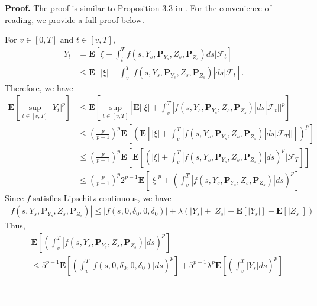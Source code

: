 \documentclass[10pt]{article}%
\numberwithin{equation}{section}
\newenvironment{proof}[1][Proof]{\noindent \textbf{#1.} }{\  \rule{0.5em}{0.5em}}
\begin{document}
\begin{proof}
    The proof is similar to Proposition 3.3 in \cite{LX}. For the convenience of reading, we provide a full proof below.

    For $v \in [0,T]$ and $t\in [v,T]$,
    \begin{equation}\begin{split}
       Y_t&=\mathbf{E}\left[\xi+\int_{t}^{T}f(s,Y_s, \mathbf{P}_{Y_s},Z_s,\mathbf{P}_{Z_s})ds|\mathcal{F}_t\right]\\
       &\leq \mathbf{E}\left[\left|\xi\right|+\int_{v}^{T}\left|f(s,Y_s, \mathbf{P}_{Y_s},Z_s,\mathbf{P}_{Z_s})\right|ds|\mathcal{F}_t\right].  
    \end{split}  
    \end{equation}
Therefore, we have 
\begin{equation}
    \begin{split}
\mathbf{E}\left[\sup_{t\in[v,T]}\left|Y_t\right|^p\right]&\leq \mathbf{E}\left[\sup_{t\in[v,T]}|\mathbf{E}[\left|\xi\right|+\int_{v}^{T}\left|f(s,Y_s, \mathbf{P}_{Y_s},Z_s,\mathbf{P}_{Z_s})\right|ds|\mathcal{F}_t]|^p\right]\\
&\leq \left(\frac{p}{p-1}\right)^p \mathbf{E}\left[\left(\mathbf{E}[\left|\xi\right|+\int_{v}^{T}\left|f(s,Y_s, \mathbf{P}_{Y_s},Z_s,\mathbf{P}_{Z_s})\right|ds|\mathcal{F}_T]|]\right)^p\right]\\
&\leq \left(\frac{p}{p-1}\right)^p \mathbf{E}\left[\mathbf{E}\left[\left(\left|\xi\right|+\int_{v}^{T}\left|f(s,Y_s, \mathbf{P}_{Y_s},Z_s,\mathbf{P}_{Z_s})\right|ds\right)^p|\mathcal{F}_T\right]\right]\\ 
&\leq \left(\frac{p}{p-1}\right)^p 2^{p-1} \mathbf{E}\left[|\xi|^p+\left(\int_{v}^{T}\left|f(s,Y_s, \mathbf{P}_{Y_s},Z_s,\mathbf{P}_{Z_s})\right|ds\right)^p\right]
\end{split}
\end{equation}
Since $f$ satisfies Lipschitz continuous, we have 
\begin{align}
    \left|f(s,Y_s, \mathbf{P}_{Y_s},Z_s,\mathbf{P}_{Z_s})\right|\leq \left|f(s,0, \delta_0,0,\delta_0)\right|+\lambda \left(\left|Y_s\right|+\left|Z_s\right|+\mathbf{E}[|Y_s|]+\mathbf{E}[|Z_s|]\right) 
\end{align}
Thus, 
\begin{align*}
    &\mathbf{E}\left[\left(\int_{v}^{T}\left|f(s,Y_s, \mathbf{P}_{Y_s},Z_s,\mathbf{P}_{Z_s})\right|ds\right)^p\right]\\
    &\leq 5^{p-1}\mathbf{E}\left[\left(\int_{v}^{T}\left|f(s,0, \delta_0,0,\delta_0)\right|ds\right)^p\right]+5^{p-1}\lambda^p\mathbf{E}\left[\left(\int_{v}^{T}\left|Y_s\right|ds\right)^p\right]\\

\end{align*}
\end{proof}
\end{document}
